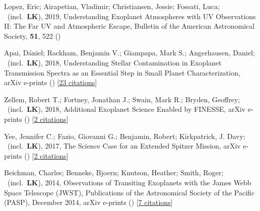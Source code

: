 \item[{\color{numcolor}\scriptsize5}] Lopez, Eric; Airapetian, Vladimir; Christiansen, Jessie; Fossati, Luca; \etal\ (incl.\ \textbf{LK}), 2019, Understanding Exoplanet Atmospheres with UV Observations II: The Far UV and Atmospheric Escape, Bulletin of the American Astronomical Society, \textbf{51}, 522 ()

\item[{\color{numcolor}\scriptsize4}] Apai, D{\'a}niel; Rackham, Benjamin V.; Giampapa, Mark S.; Angerhausen, Daniel; \etal\ (incl.\ \textbf{LK}), 2018, Understanding Stellar Contamination in Exoplanet Transmission Spectra as an Essential Step in Small Planet Characterization, arXiv e-prints () [\href{https://ui.adsabs.harvard.edu/abs/2018arXiv180308708A}{23 citations}]

\item[{\color{numcolor}\scriptsize3}] Zellem, Robert T.; Fortney, Jonathan J.; Swain, Mark R.; Bryden, Geoffrey; \etal\ (incl.\ \textbf{LK}), 2018, Additional Exoplanet Science Enabled by FINESSE, arXiv e-prints () [\href{https://ui.adsabs.harvard.edu/abs/2018arXiv180307163Z}{2 citations}]

\item[{\color{numcolor}\scriptsize2}] Yee, Jennifer C.; Fazio, Giovanni G.; Benjamin, Robert; Kirkpatrick, J. Davy; \etal\ (incl.\ \textbf{LK}), 2017, The Science Case for an Extended Spitzer Mission, arXiv e-prints () [\href{https://ui.adsabs.harvard.edu/abs/2017arXiv171004194Y}{2 citations}]

\item[{\color{numcolor}\scriptsize1}] Beichman, Charles; Benneke, Bjoern; Knutson, Heather; Smith, Roger; \etal\ (incl.\ \textbf{LK}), 2014, Observations of Transiting Exoplanets with the James Webb Space Telescope (JWST), Publications of the Astronomical Society of the Pacific (PASP), December 2014, arXiv e-prints () [\href{https://ui.adsabs.harvard.edu/abs/2014arXiv1411.1754B}{7 citations}]